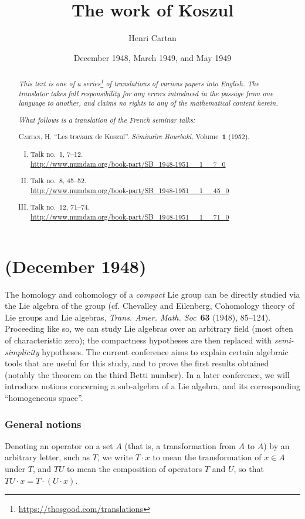 \documentclass{article}
\title{The work of Koszul}
\author{Henri Cartan}
\date{December 1948, March 1949, and May 1949}
\newcommand{\doctype}{French seminar talks}
\newcommand{\origcit}{%
  \textsc{Cartan, H.}
  ``Les travaux de Koszul''.
  \emph{S\'{e}minaire Bourbaki}, Volume~\textbf{1} (1952),
  \begin{enumerate}[I.]
    \item Talk no.~1, 7--12.
      \\{\url{http://www.numdam.org/book-part/SB_1948-1951__1__7_0}}
    \item Talk no.~8, 45--52.
      \\{\url{http://www.numdam.org/book-part/SB_1948-1951__1__45_0}}
    \item Talk no.~12, 71--74.
      \\{\url{http://www.numdam.org/book-part/SB_1948-1951__1__71_0}}
  \end{enumerate}%
}
\newcommand{\oldpage}[1]{\marginpar{\footnotesize$\Big\vert$ \textit{p.~#1}}}
\begin{document}
\maketitle
\thispagestyle{fancy}

\renewcommand{\abstractname}{Translator's note.}

\begin{abstract}
  \renewcommand*{\thefootnote}{\fnsymbol{footnote}}
  \emph{This text is one of a series\footnote{\url{https://thosgood.com/translations}} of translations of various papers into English.}
  \emph{The translator takes full responsibility for any errors introduced in the passage from one language to another, and claims no rights to any of the mathematical content herein.}

  \emph{What follows is a translation of the \doctype:}

  \medskip\noindent
  \origcit
\end{abstract}

\setcounter{footnote}{0}

\tableofcontents
\bigskip



\part{(December 1948)}
\label{I}

\oldpage{7}
The homology and cohomology of a \emph{compact} Lie group can be directly studied via the Lie algebra of the group (cf. {\sc Chevalley and Eilenberg}, Cohomology theory of Lie groups and Lie algebras, \emph{Trans. Amer. Math. Soc}~\textbf{63} (1948), 85--124).
Proceeding like so, we can study Lie algebras over an arbitrary field (most often of characteristic zero);
the compactness hypotheses are then replaced with \emph{semi-simplicity} hypotheses.
The current conference aims to explain certain algebraic tools that are useful for this study, and to prove the first results obtained (notably the theorem on the third Betti number).
In a later conference, we will introduce notions concerning a sub-algebra of a Lie algebra, and its corresponding ``homogeneous space''.


\section{General notions}
\label{I.1}

Denoting an operator on a set $A$ (that is, a transformation from $A$ to $A$) by an arbitrary letter, such as $T$, we write $T\cdot x$ to mean the transformation of $x\in A$ under $T$, and $TU$ to mean the composition of operators $T$ and $U$, so that $TU\cdot x = T\cdot (U\cdot x)$.
\end{document}
